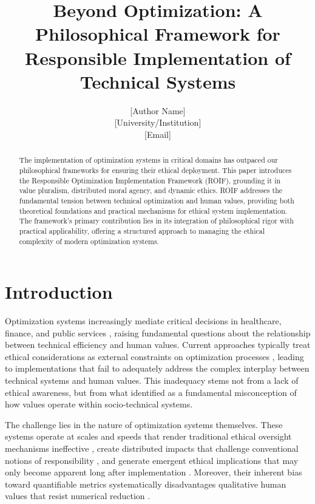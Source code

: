 \documentclass[12pt]{article}
\title{Beyond Optimization: A Philosophical Framework for Responsible Implementation of Technical Systems}
\author{[Author Name]\\ \mbox{[University/Institution]}\\ \mbox{[Email]}}
\begin{document}
\maketitle

\begin{abstract}
The implementation of optimization systems in critical domains has outpaced our philosophical frameworks for ensuring their ethical deployment. This paper introduces the Responsible Optimization Implementation Framework (ROIF), grounding it in value pluralism, distributed moral agency, and dynamic ethics. ROIF addresses the fundamental tension between technical optimization and human values, providing both theoretical foundations and practical mechanisms for ethical system implementation. The framework's primary contribution lies in its integration of philosophical rigor with practical applicability, offering a structured approach to managing the ethical complexity of modern optimization systems.
\end{abstract}

\section{Introduction}
Optimization systems increasingly mediate critical decisions in healthcare, finance, and public services \parencite{yeung2018,zarsky2016}, raising fundamental questions about the relationship between technical efficiency and human values. Current approaches typically treat ethical considerations as external constraints on optimization processes \parencite{mittelstadt2016}, leading to implementations that fail to adequately address the complex interplay between technical systems and human values. This inadequacy stems not from a lack of ethical awareness, but from what \textcite{winner1980} identified as a fundamental misconception of how values operate within socio-technical systems.

The challenge lies in the nature of optimization systems themselves. These systems operate at scales and speeds that render traditional ethical oversight mechanisms ineffective \parencite{citron2014}, create distributed impacts that challenge conventional notions of responsibility \parencite{matthias2004}, and generate emergent ethical implications that may only become apparent long after implementation \parencite{ananny2018}. Moreover, their inherent bias toward quantifiable metrics systematically disadvantages qualitative human values that resist numerical reduction \parencite{kearns2019}.
\end{document}
